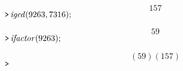 \documentclass{article}
\begin{document}
\begin{dmath}\label{(30)}
157
\end{dmath}
\mapleinput
{$ \displaystyle \texttt{>\,} \mathit{igcd} (9263,7316); $}

\begin{dmath}\label{(31)}
59
\end{dmath}
\mapleinput
{$ \displaystyle \texttt{>\,} \mathit{ifactor} (9263); $}

\begin{dmath}\label{(32)}
\left(59\right) \left(157\right)
\end{dmath}
\mapleinput
{$ \displaystyle \texttt{>\,} \, $}
\end{document}
